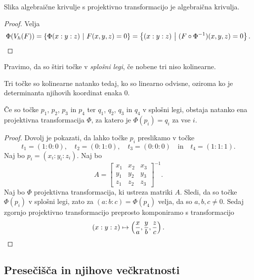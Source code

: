 \begin{trditev}
Slika algebraične krivulje s projektivno transformacijo je
algebraična krivulja.
\end{trditev}

\begin{proof}
Velja
\[
\Phi(V_h(F)) =
\left\{\Phi(x : y : z)~\middle\vert~F(x, y, z) = 0\right\} =
\left\{(x : y : z)~\middle\vert~(F \circ \Phi^{-1})(x, y, z) = 0\right\}. \qedhere
\]
\end{proof}

\begin{definicija}
Pravimo, da so štiri točke v
\emph{splošni legi}, če
nobene tri niso kolinearne.
\end{definicija}

\begin{opomba}
Tri točke so kolinearne natanko tedaj, ko so linearno odvisne,
oziroma ko je determinanta njihovih koordinat enaka $0$.
\end{opomba}

\begin{lema}
Če so točke $p_1$, $p_2$, $p_3$ in $p_4$ ter $q_1$, $q_2$, $q_3$ in
$q_4$ v splošni legi, obstaja natanko ena projektivna
transformacija $\Phi$, za katero je $\Phi(p_i) = q_i$ za vse $i$.
\end{lema}

\begin{proof}
Dovolj je pokazati, da lahko točke $p_i$ preslikamo v točke
\[
t_1 = (1 : 0 : 0), \quad
t_2 = (0 : 1 : 0), \quad
t_3 = (0 : 0 : 0)
\quad \text{in} \quad
t_4 = (1 : 1 : 1).
\]
Naj bo $p_i = (x_i : y_i : z_i)$. Naj bo
\[
A =
\begin{bmatrix}
x_1 & x_2 & x_3 \\
y_1 & y_2 & y_3 \\
z_1 & z_2 & z_3
\end{bmatrix}^{-1}.
\]
Naj bo $\Phi$ projektivna transformacija, ki ustreza matriki $A$.
Sledi, da so točke $\Phi(p_i)$ v splošni legi, zato za
$(a : b : c) = \Phi(p_4)$ velja, da so $a, b, c \ne 0$. Sedaj
zgornjo projektivno transformacijo preprosto komponiramo s
transformacijo
\[
(x : y : z) \mapsto
\left(\frac{x}{a}, \frac{y}{b}, \frac{z}{c}\right). \qedhere
\]
\end{proof}

\newpage

\subsection{Presečišča in njihove večkratnosti}

